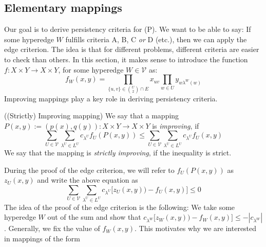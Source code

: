\subsection{Elementary mappings}
Our goal is to derive persistency criteria for (P). We want to be able to say: If some hyperedge $W$ fulfills criteria A, B, C \textit{or} D (etc.), then we can apply the edge criterion. The idea is that for different problems, different criteria are easier to check than others. 
In this section, it makes sense to introduce the function $f: X \times Y \to X \times Y$, for some hyperedge $W \in \mathcal{V}$ as:
\[ f_W(x,y)= \prod_{\{u,v\} \in \binom{U}{2} \cap E} x_{uv} \prod_{w \in U} y_{w \lambda^W(w)} \] 
Improving mappings play a key role in deriving persistency criteria.
\begin{lemma}{((Strictly) Improving mapping)}
We say that a mapping $P(x,y):=(p(x),q(y)): X \times Y \to X \times Y$ is \textit{improving}, if 
\begin{equation}
    \sum_{U \in \mathcal{V}} \sum_{\lambda^U \in L^U} c_{\lambda^U}  f_U(P(x,y)) \leq \sum_{U \in \mathcal{V}} \sum_{\lambda^U \in L^U} c_{\lambda^U}  f_U(x,y)
\end{equation}
We say that the mapping is \textit{strictly improving}, if the inequality is strict.
\end{lemma}  During the proof of the edge criterion, we will refer to $f_U(P(x,y))$ as $z_U(x,y)$ and write the above equation as 
\begin{equation}
    \sum_{U \in \mathcal{V}} \sum_{\lambda^U \in L^U} c_{\lambda^U}  \Big[ z_U(x,y)) -  f_U(x,y) \Big] \leq 0
\end{equation}
The idea of the proof of the edge criterion is the following: We take some hyperedge $W$ out of the sum and show that $c_{\lambda^W}  \Big[ z_W(x,y)) - f_W(x,y) \Big] \leq - |c_{\lambda^W}|$. Generally, we fix the value of $f_W(x,y)$. This motivates why we are interested in mappings of the form  
